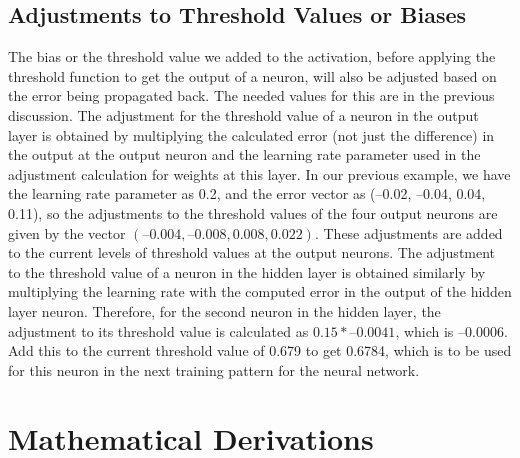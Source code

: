 \documentclass[12pt, right open]{memoir}
\begin{document}
\subsection{Adjustments to Threshold Values or Biases}
The bias or the threshold value we added to the activation, before applying the
threshold function to get the output of a neuron, will also be adjusted based on
the error being propagated back. The needed values for this are in the previous
discussion.
The adjustment for the threshold value of a neuron in the output layer is
obtained by multiplying the calculated error (not just the difference) in the
output at the output neuron and the learning rate parameter used in the
adjustment calculation for weights at this layer. In our previous example, we
have the learning rate parameter as 0.2, and the error vector as (–0.02, –0.04,
0.04, 0.11), so the adjustments to the threshold values of the four output
neurons are given by the vector $(–0.004, –0.008, 0.008, 0.022)$. These
adjustments are added to the current levels of threshold values at the output
neurons.
The adjustment to the threshold value of a neuron in the hidden layer is
obtained similarly by multiplying the learning rate with the computed error in
the output of the hidden layer neuron. Therefore, for the second neuron in the
hidden layer, the adjustment to its threshold value is calculated as $0.15 *
–0.0041$, which is $–0.0006$. Add this to the current threshold value of 0.679 to
get 0.6784, which is to be used for this neuron in the next training pattern for
the neural network.

\section{Mathematical Derivations}
\end{document}
